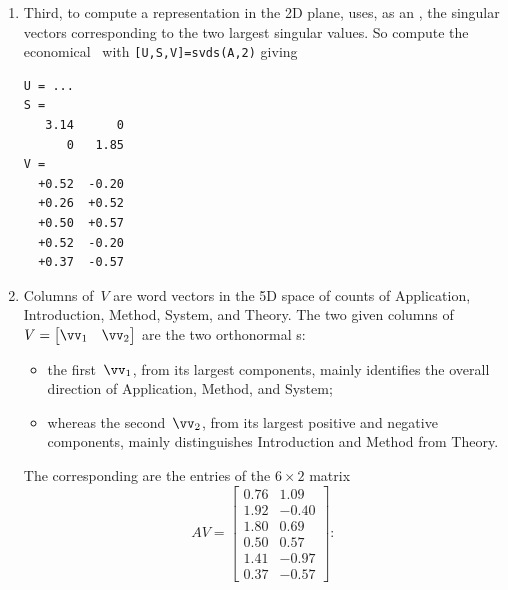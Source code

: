 \begin{enumerate}
\item Third, to compute a representation in the 2D plane,  uses, as an , the singular vectors corresponding to the two largest singular values.  
So compute the economical \svd\ with \verb|[U,S,V]=svds(A,2)| giving \twodp
\begin{verbatim}
U = ...
S =
   3.14      0
      0   1.85
V =
  +0.52  -0.20
  +0.26  +0.52
  +0.50  +0.57
  +0.52  -0.20
  +0.37  -0.57
\end{verbatim}

\item Columns of~\(V\) are word vectors in the 5D space of counts of Application, Introduction, Method, System, and Theory.
The two given columns of \(V=\begin{bmatrix} \vv_1&\vv_2 \end{bmatrix}\) are the two orthonormal s:
\begin{itemize}
\item the first~\(\vv_1\), from its largest components, mainly identifies the overall direction of Application, Method, and System;
\item whereas the second~\(\vv_2\), from its largest positive and negative components, mainly distinguishes Introduction and Method from Theory.
\end{itemize}
The corresponding  are the entries of the \(6\times 2\) matrix
\begin{equation*}
AV=\begin{bmatrix} 0.76 & 1.09 \\
1.92 & -0.40 \\
1.80 & 0.69 \\
0.50 & 0.57 \\
1.41 & -0.97 \\
0.37 & -0.57 \end{bmatrix}:
\end{equation*}


\end{enumerate}
